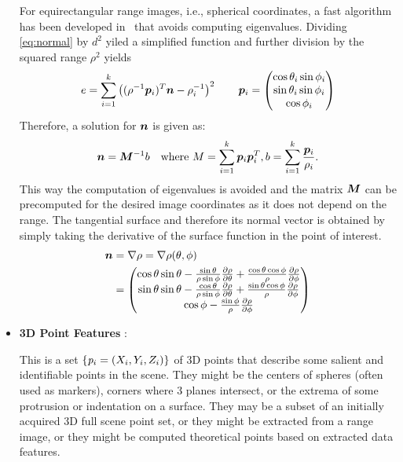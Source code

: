 \documentclass[twocolumn,oneside]{book}
\newcommand{\V}[1]{\vector{#1}}  %
\newcommand{\M}[1]{\V{#1}}    %
\begin{document}
\begin{itemize}
  For equirectangular range images, i.e., spherical coordinates, a
  fast algorithm has been developed in~\cite{Badino_2011} that avoids
  computing eigenvalues. Dividing \eqref{eq:normal} by $d^2$ yiled a
  simplified function and further division by the squared range
  $\rho^2$ yields
\begin{align*}
  e = \sum_{i=1}^k \left( (\rho^{-1}\V p_i)^T \V n - \rho_i^{-1}\right)^2
  \qquad
  \V p_i =
  \begin{pmatrix}
    \cos \theta_i \sin \phi_i\\
    \sin \theta_i \sin \phi_i\\
    \cos \phi_i
  \end{pmatrix}
\end{align*}  
  Therefore, a solution for $\V n$ is given as:
\begin{align*}
  \V n = \M M^{-1} b \quad \text{where} \ M = \sum_{i=1}^{k}\V p_i \V p_i^T,
  b = \sum_{i=1}^{k} \frac{\V p_i}{\rho_i}.
\end{align*}
  This way the computation of eigenvalues is avoided and the matrix
  $\M M$ can be precomputed for the desired image coordinates as it
  does not depend on the range. The tangential surface and therefore
  its normal vector is obtained by simply taking the derivative of
  the surface function in the point of interest.
\begin{align*}
  \V n
  & = \nabla \rho = \nabla \rho(\theta,\phi)\\
  & = \begin{pmatrix}
    \cos \theta \sin \theta
    - \frac{\sin \theta}{\rho \sin \phi} \frac{\partial \rho}{\partial \theta}
    + \frac{\cos \theta \cos \phi}{\rho} \frac{\partial \rho}{\partial \phi}\\
    \sin \theta \sin \theta
    - \frac{\cos \theta}{\rho \sin \phi} \frac{\partial \rho}{\partial \theta}
    + \frac{\sin \theta \cos \phi}{\rho} \frac{\partial \rho}{\partial \phi}\\
    \cos \phi - \frac{\sin \phi}{\rho} \frac{\partial \rho}{\partial \phi}
    \end{pmatrix}
\end{align*}

  
\item {\bf 3D Point Features }:

  This is a set $\{ {\bf \it p}_i = (X_i,Y_i,Z_i)\}$ of 3D points that
  describe some salient and identifiable points in the scene. They
  might be the centers of spheres (often used as markers), corners
  where 3 planes intersect, or the extrema of some protrusion or
  indentation on a surface.  They may be a subset of an initially
  acquired 3D full scene point set, or they might be extracted from a
  range image, or they might be computed theoretical points based on
  extracted data features.


\end{itemize}
\end{document}
